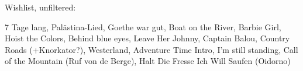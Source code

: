 Wishlist, unfiltered:

7 Tage lang, 
Palästina-Lied, 
Goethe war gut, 
Boat on the River,
Barbie Girl,
Hoist the Colors,
Behind blue eyes,
Leave Her Johnny,
Captain Balou,
Country Roads (+Knorkator?),
Westerland,
Adventure Time Intro,
I'm still standing,
Call of the Mountain (Ruf von de Berge),
Halt Die Fresse Ich Will Saufen (Oidorno)
